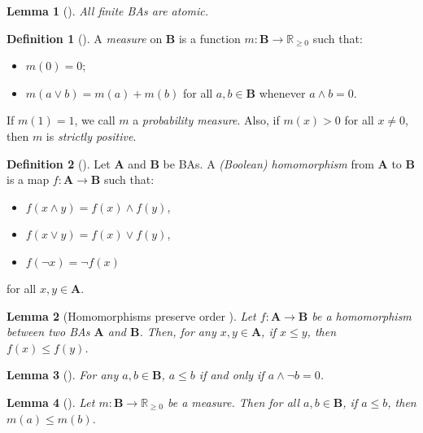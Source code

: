 \documentclass{article}
\newtheorem{lemma}{Lemma}
\theoremstyle{definition}
\newtheorem{definition}{Definition}
\theoremstyle{remark}
\begin{document}
\begin{lemma}[\cite{givant2008introduction}] \label{lemma:atomic}
  All finite BAs are atomic.
\end{lemma}

\begin{definition}[\cite{gaifman1964concerning,DBLP:books/daglib/0090259}] \label{def:measure}
  A \emph{measure} on $\mathbf{B}$ is a function $m\colon
  \mathbf{B} \to \mathbb{R}_{\ge 0}$ such that:
  \begin{itemize}
  \item $m(0) = 0$;
  \item $m(a \lor b) = m(a) + m(b)$ for all $a, b \in \mathbf{B}$ whenever $a
    \land b = 0$.
  \end{itemize}
  If $m(1) = 1$, we call $m$ a \emph{probability measure}. Also, if $m(x) > 0$
  for all $x \ne 0$, then $m$ is \emph{strictly positive}.
\end{definition}

\begin{definition}[\cite{givant2008introduction}]
  Let $\mathbf{A}$ and $\mathbf{B}$ be BAs. A \emph{(Boolean) homomorphism} from
  $\mathbf{A}$ to $\mathbf{B}$ is a map $f\colon \mathbf{A} \to \mathbf{B}$ such
  that:
  \begin{itemize}
  \item $f(x \land y) = f(x) \land f(y)$,
  \item $f(x \lor y) = f(x) \lor f(y)$,
  \item $f(\neg x) = \neg f(x)$
  \end{itemize}
  for all $x, y \in \mathbf{A}$.
\end{definition}

\begin{lemma}[Homomorphisms preserve order
  \cite{givant2008introduction}] \label{lemma:homomorphisms_and_order}
  Let $f\colon \mathbf{A} \to \mathbf{B}$ be a homomorphism between two BAs
  $\mathbf{A}$ and $\mathbf{B}$. Then, for any $x, y \in \mathbf{A}$, if $x \le
  y$, then $f(x) \le f(y)$.
\end{lemma}

\begin{lemma}[\cite{sikorski1969boolean}] \label{lemma:order}
  For any $a, b \in \mathbf{B}$, $a \le b$ if and only if $a \land \neg b = 0$.
\end{lemma}

\begin{lemma}[\cite{givant2008introduction}] \label{lemma:measure_and_order}
  Let $m\colon \mathbf{B} \to \mathbb{R}_{\ge 0}$ be a measure. Then for all $a,
  b \in \mathbf{B}$, if $a \le b$, then $m(a) \le m(b)$.
\end{lemma}
\end{document}

